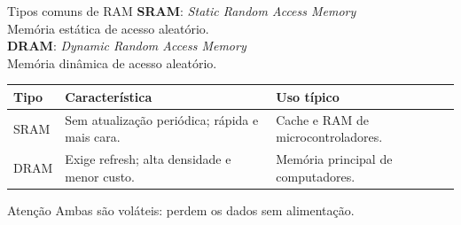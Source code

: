 \begin{frame}[t]{Tipos comuns de RAM}
  \small
  \textbf{SRAM}: \textit{Static Random Access Memory}\\
  Memória estática de acesso aleatório.\\[0.15cm]
  \textbf{DRAM}: \textit{Dynamic Random Access Memory}\\
  Memória dinâmica de acesso aleatório.
  \vspace{0.25cm}

  \setlength{\tabcolsep}{4pt}
  \begin{tabular}{>{\raggedright\arraybackslash}p{} p{} p{}}
    \toprule
    \textbf{Tipo} & \textbf{Característica} & \textbf{Uso típico} \\
    \midrule
    SRAM & Sem atualização periódica; rápida e mais cara. & Cache e RAM de microcontroladores. \\
    DRAM & Exige refresh; alta densidade e menor custo. & Memória principal de computadores. \\
    \bottomrule
  \end{tabular}
  \vspace{0.15cm}
  \begin{alertblock}{Atenção}
    Ambas são voláteis: perdem os dados sem alimentação.
  \end{alertblock}
\end{frame}
